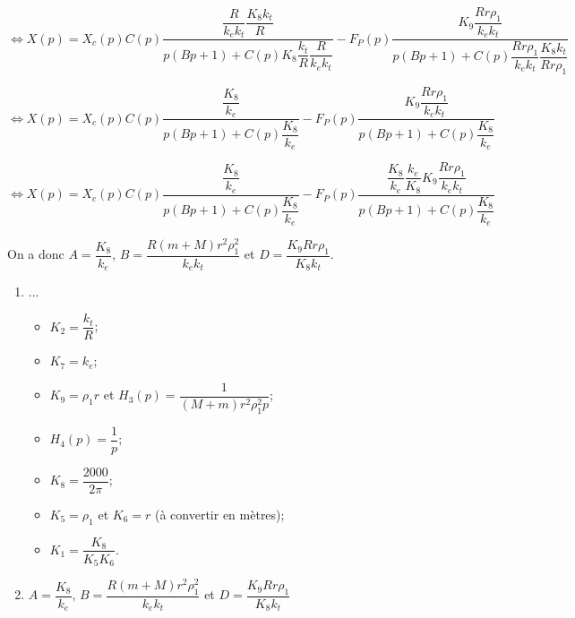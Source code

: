 $\Leftrightarrow X(p)
=
X_c(p) C(p)\dfrac{
\dfrac{R}{k_ek_t}\dfrac{K_8k_t}{R}}{
p\left(B p +  1\right) 
 + C(p)K_8 \dfrac{k_t}{R} \dfrac{R}{k_ek_t}
 }
- F_P(p)\dfrac{K_9\dfrac{Rr\rho_1}{  k_ek_t}}{
p\left(
B  p
 + 1\right)
 + C(p)\dfrac{Rr\rho_1}{  k_ek_t}\dfrac{ K_8 k_t}{Rr\rho_1 } }
$

$\Leftrightarrow X(p)
=
X_c(p) C(p)\dfrac{
\dfrac{K_8}{k_e}}{
p\left(B p +  1\right) 
 + C(p) \dfrac{K_8 }{k_e}
 }
- F_P(p)\dfrac{K_9\dfrac{Rr\rho_1}{  k_ek_t}}{
p\left(
B  p
 + 1\right)
 + C(p)\dfrac{K_8}{  k_e} }
$



$\Leftrightarrow X(p)
=
X_c(p) C(p)\dfrac{
\dfrac{K_8}{k_e}}{
p\left(B p +  1\right) 
 + C(p) \dfrac{K_8 }{k_e}
 }
- F_P(p)\dfrac{ \dfrac{K_8}{  k_e} \dfrac{  k_e}{K_8}K_9\dfrac{Rr\rho_1}{  k_ek_t}}{
p\left(
B  p
 + 1\right)
 + C(p)\dfrac{K_8}{  k_e} }
$



On a donc $A=\dfrac{K_8}{k_e}$, $B=\dfrac{R\left(m+M\right)r^2\rho_1^2}{k_ek_t}$ et 
$D = \dfrac{ K_9 Rr\rho_1}{  K_8k_t}$.
\else
\fi

\ifprof
\else
\ifcolle
\else
\begin{solution}
\begin{enumerate}
\item ...
\begin{itemize}
\item $K_2 = \dfrac{k_t}{R}$;
\item $K_7 = k_e$;
\item $K_9 = \rho_1 r$ et $H_3(p)=\dfrac{1}{\left(M+m\right)r^2\rho_1^2 p}$;
\item $H_4(p)=\dfrac{1}{p}$; 
\item $K_8  = \dfrac{2000}{2\pi}$;
\item $K_5=\rho_1$ et $K_6=r$ (à convertir en mètres);
\item $K_1 =\dfrac{K_8}{K_5 K_6}$.
\end{itemize}
\item $A=\dfrac{K_8}{k_e}$, $B=\dfrac{R\left(m+M\right)r^2\rho_1^2}{k_ek_t}$ et 
$D = \dfrac{ K_9 Rr\rho_1}{  K_8k_t}$
\end{enumerate}
\end{solution}
\fi
\fi



\ifprof
\else


\fi

